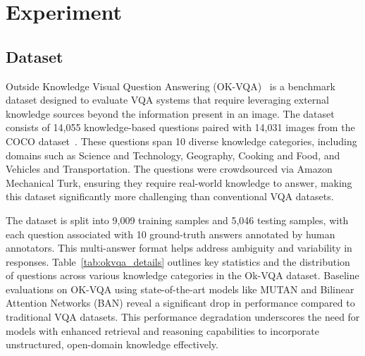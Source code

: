 \section{Experiment}
\label{sec:Experiment}

\subsection{Dataset}
Outside Knowledge Visual Question Answering (OK-VQA)~\cite{marino2019ok} is a benchmark dataset designed to evaluate VQA systems that require leveraging external knowledge sources beyond the information present in an image. The dataset consists of 14,055 knowledge-based questions paired with 14,031 images from the COCO dataset~\cite{lin2014microsoft}. These questions span 10 diverse knowledge categories, including domains such as Science and Technology, Geography, Cooking and Food, and Vehicles and Transportation. The questions were crowdsourced via Amazon Mechanical Turk, ensuring they require real-world knowledge to answer, making this dataset significantly more challenging than conventional VQA datasets. 

The dataset is split into 9,009 training samples and 5,046 testing samples, with each question associated with 10 ground-truth answers annotated by human annotators. This multi-answer format helps address ambiguity and variability in responses. Table~\ref{tab:okvqa_details} outlines key statistics and the distribution of questions across various knowledge categories in the Ok-VQA dataset. Baseline evaluations on OK-VQA using state-of-the-art models like MUTAN and Bilinear Attention Networks (BAN) reveal a significant drop in performance compared to traditional VQA datasets. This performance degradation underscores the need for models with enhanced retrieval and reasoning capabilities to incorporate unstructured, open-domain knowledge effectively.

